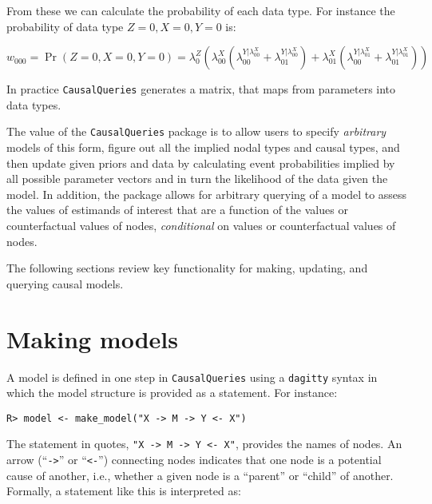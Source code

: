 \documentclass[
  11pt,
  article]{jss}
\begin{document}
From these we can calculate the probability of each data type. For
instance the probability of data type \(Z=0, X=0, Y=0\) is:

\[w_{000}=\Pr(Z=0, X=0, Y=0) = \lambda^Z_0\left(\lambda^X_{00}(\lambda^{Y|\lambda^X_{00}}_{00}+\lambda^{Y|\lambda^X_{00}}_{01}) + \lambda^X_{01}(\lambda^{Y|\lambda^X_{01}}_{00}+\lambda^{Y|\lambda^X_{01}}_{01})\right)\]

In practice \texttt{CausalQueries} generates a matrix, that maps from
parameters into data types.

The value of the \texttt{CausalQueries} package is to allow users to
specify \emph{arbitrary} models of this form, figure out all the implied
nodal types and causal types, and then update given priors and data by
calculating event probabilities implied by all possible parameter
vectors and in turn the likelihood of the data given the model. In
addition, the package allows for arbitrary querying of a model to assess
the values of estimands of interest that are a function of the values or
counterfactual values of nodes, \emph{conditional} on values or
counterfactual values of nodes.

The following sections review key functionality for making, updating,
and querying causal models.

\section{Making models}\label{sec-make}

A model is defined in one step in \texttt{CausalQueries} using a
\texttt{dagitty} syntax \citep{textor_robust_2016} in which the model
structure is provided as a statement. For instance:

\begin{verbatim}
R> model <- make_model("X -> M -> Y <- X")
\end{verbatim}

The statement in quotes,
\texttt{"X\ -\textgreater{}\ M\ -\textgreater{}\ Y\ \textless{}-\ X"},
provides the names of nodes. An arrow (``\texttt{-\textgreater{}}'' or
``\texttt{\textless{}-}'') connecting nodes indicates that one node is a
potential cause of another, i.e., whether a given node is a ``parent''
or ``child'' of another. Formally, a statement like this is interpreted
as:
\end{document}

